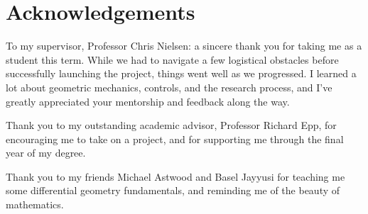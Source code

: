 \documentclass[main.tex]{subfiles}
\begin{document}
\chapter{Acknowledgements}
To my supervisor, Professor Chris Nielsen: a sincere thank you for taking me as a student this term. While we had to navigate a few logistical obstacles before successfully launching the project, things went well as we progressed. I learned a lot about geometric mechanics, controls, and the research process, and I've greatly appreciated your mentorship and feedback along the way.

Thank you to my outstanding academic advisor, Professor Richard Epp, for encouraging me to take on a project, and for supporting me through the final year of my degree. 

Thank you to my friends Michael Astwood and Basel Jayyusi for teaching me some differential geometry fundamentals, and reminding me of the beauty of mathematics.
\end{document}
